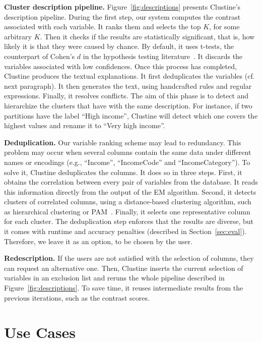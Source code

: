 \textbf{Cluster description pipeline.} Figure~\ref{fig:descriptions} presents
Clustine's description pipeline. During the first step, our system computes the
contrast associated with each variable. It ranks them and selects the
top $K$, for some arbitrary $K$. Then it checks if the results are
statistically significant, that is, how likely it is that they were caused by
chance. By default, it uses t-tests, the counterpart of Cohen's $d$ in the
hypothesis testing literature~\cite{cohen1977statistical}. It discards the
variables associated with low confidences. Once this process has completed,
Clustine produces the textual explanations. It first deduplicates the
variables (cf. next paragraph). It then generates the text, using handcrafted
rules and regular expressions.  Finally, it resolves conflicts. The aim
of this phase is to detect and hierarchize the clusters that have with the
same description. For instance, if two partitions have the label ``High
income'', Clustine will detect  which one covers the highest values and rename it
to ``Very high income''.

\textbf{Deduplication.} Our variable ranking scheme may lead to redundancy.
This problem may occur when several columns contain the same data under
different names or encodings (e.g., ``Income'', ``IncomeCode'' and
``IncomeCategory''). To solve it, Clustine deduplicates the columns.  It does
so in three steps. First, it obtains the correlation between every pair of
variables from the database. It reads this information directly from the output
of the EM algorithm. Second, it detects clusters of correlated columns, using a
distance-based clustering algorithm, such as hierarchical clustering or
PAM~\cite{bishop2001bishop}.  Finally, it selects one representative column for
each cluster.  The deduplication step enforces that the results are diverse,
but it comes with runtime and accuracy penalties (described in
Section~\ref{sec:eval}). Therefore, we leave it as an option, to be chosen by
the user.

\textbf{Redescription.} If the users are not satisfied with the selection of
columns, they can request an alternative one. Then, Clustine inserts the
current selection of variables in an exclusion list and reruns the whole
pipeline described in Figure~\ref{fig:descriptions}. To save time, it reuses
intermediate results from the previous iterations, such as the contrast
scores.

\section{Use Cases}
\label{sec:demo}


